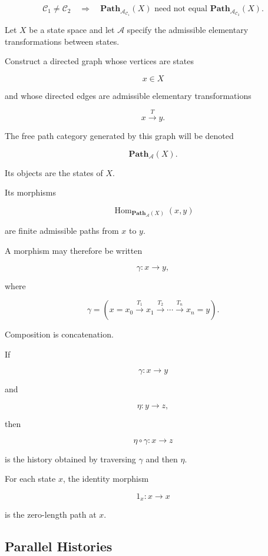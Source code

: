 \documentclass[
  11pt,
  a4paper,
  DIV=12,
  BCOR=0mm,
  parskip=half-
]{scrartcl}
\newcommand{\Hom}{\operatorname{Hom}}
\theoremstyle{definition}
\theoremstyle{plain}
\theoremstyle{remark}
\begin{document}
\[
  \mathcal C_1\neq\mathcal C_2
  \quad\Longrightarrow\quad
  \mathbf{Path}_{\mathcal A_{\mathcal C_1}}(X)
  \text{ need not equal }
  \mathbf{Path}_{\mathcal A_{\mathcal C_2}}(X).
\]

Let \(X\) be a state space and let \(\mathcal A\) specify the admissible
elementary transformations between states.

Construct a directed graph whose vertices are states

\[
  x\in X
\]

and whose directed edges are admissible elementary transformations

\[
  x\xrightarrow{T}y.
\]

The free path category generated by this graph will be denoted

\[
  \mathbf{Path}_{\mathcal A}(X).
\]

Its objects are the states of \(X\).

Its morphisms

\[
  \Hom_{\mathbf{Path}_{\mathcal A}(X)}(x,y)
\]

are finite admissible paths from \(x\) to \(y\).

A morphism may therefore be written

\[
  \gamma:
  x
  \longrightarrow
  y,
\]

where

\[
  \gamma
  =
  \left(
  x=x_0
  \xrightarrow{T_1}
  x_1
  \xrightarrow{T_2}
  \cdots
  \xrightarrow{T_n}
  x_n=y
  \right).
\]

Composition is concatenation.

If

\[
  \gamma:x\to y
\]

and

\[
  \eta:y\to z,
\]

then

\[
  \eta\circ\gamma:x\to z
\]

is the history obtained by traversing \(\gamma\) and then \(\eta\).

For each state \(x\), the identity morphism

\[
  1_x:x\to x
\]

is the zero-length path at \(x\).


\subsection{Parallel Histories}
\label{app:parallel-histories}
\end{document}
